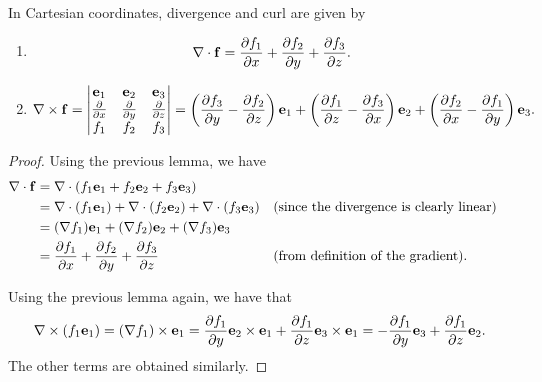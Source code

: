 \documentclass[10pt, a4paper]{article}
\begin{document}
\begin{proposition}
    In Cartesian coordinates,
    divergence and curl are given by
    \begin{enumerate}[label = (\roman*)]
        \item
        \[
        \bnabla \cdot \vec{f} = \pd[f_1]{x} + \pd[f_2]{y} + \pd[f_3]{z}.
        \]

        \item
        \[
        \bnabla \times \vec{f} = \begin{vmatrix}
            \vec{e}_1 & \vec{e}_2 & \vec{e}_3 \\
            \pd{x} & \pd{y} & \pd{z} \\
            f_1 & f_2 & f_3
        \end{vmatrix} = \left(\pd[f_3]{y} - \pd[f_2]{z}\right)\vec{e}_1 + \left(\pd[f_1]{z} - \pd[f_3]{x}\right)\vec{e}_2 + \left(\pd[f_2]{x} - \pd[f_1]{y}\right)\vec{e}_3.
        \]
    \end{enumerate}

    \begin{proof}
        Using the previous lemma,
        we have
        \begin{align*}
            \bnabla \cdot \vec{f} &= \bnabla \cdot (f_1\vec{e}_1 + f_2\vec{e}_2 + f_3\vec{e}_3) \\
            &= \bnabla \cdot (f_1\vec{e}_1) + \bnabla \cdot (f_2\vec{e}_2) + \bnabla \cdot (f_3\vec{e}_3) &&(\text{since the divergence is clearly linear}) \\
            &= (\bnabla f_1)\vec{e}_1 + (\bnabla f_2)\vec{e}_2 + (\bnabla f_3)\vec{e}_3 \\
            &= \pd[f_1]{x} + \pd[f_2]{y} + \pd[f_3]{z} &&(\text{from definition of the gradient}).
        \end{align*}

        Using the previous lemma again,
        we have that
        \[
        \bnabla \times (f_1\vec{e}_1) = (\bnabla f_1) \times \vec{e}_1 = \pd[f_1]{y}\vec{e}_2 \times \vec{e}_1 + \pd[f_1]{z}\vec{e}_3 \times \vec{e}_1 = -\pd[f_1]{y}\vec{e}_3 + \pd[f_1]{z}\vec{e}_2.
        \]
        The other terms are obtained similarly.
    \end{proof}
\end{proposition}
\end{document}
